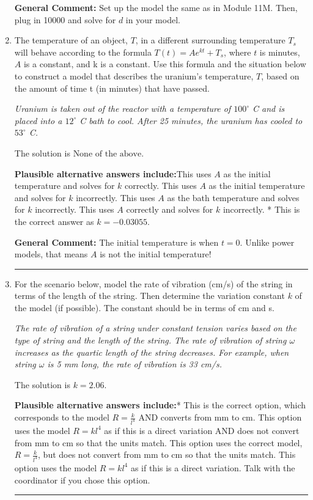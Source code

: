 \documentclass{extbook}[14pt]
\newcommand{\litem}[1]{\item #1

\rule{\textwidth}{0.4pt}}
\begin{document}
\begin{enumerate}
{\textbf{General Comment:} Set up the model the same as in Module 11M. Then, plug in 10000 and solve for $d$ in your model.
}
\litem{
The temperature of an object, $T$, in a different surrounding temperature $T_s$ will behave according to the formula $T(t) = Ae^{kt} + T_s$, where $t$ is minutes, $A$ is a constant, and k is a constant. Use this formula and the situation below to construct a model that describes the uranium's temperature, $T$, based on the amount of time t (in minutes) that have passed.

\begin{center}
    \textit{ Uranium is taken out of the reactor with a temperature of $100^{\circ}$ C and is placed into a $12^{\circ}$ C bath to cool. After 25 minutes, the uranium has cooled to $53^{\circ}$ C. }
\end{center}
The solution is \( \text{None of the above} \).\begin{enumerate}[label=\Alph*.]
\textbf{Plausible alternative answers include:}This uses $A$ as the initial temperature and solves for $k$ correctly.
This uses $A$ as the initial temperature and solves for $k$ incorrectly.
This uses $A$ as the bath temperature and solves for $k$ incorrectly.
This uses $A$ correctly and solves for $k$ incorrectly.
* This is the correct answer as $k = -0.03055$.
\end{enumerate}

\textbf{General Comment:} The initial temperature is when $t = 0$. Unlike power models, that means $A$ is not the initial temperature!
}
\litem{
For the scenario below, model the rate of vibration (cm/s) of the string in terms of the length of the string. Then determine the variation constant $k$ of the model (if possible). The constant should be in terms of cm and s.

\begin{center}
    \textit{ The rate of vibration of a string under constant tension varies based on the type of string and the length of the string. The rate of vibration of string $\omega$ increases as the quartic length of the string decreases. For example, when string $\omega$ is 5 mm long, the rate of vibration is 33 cm/s. }
\end{center}
The solution is \( k = 2.06 \).\begin{enumerate}[label=\Alph*.]
\textbf{Plausible alternative answers include:}* This is the correct option, which corresponds to the model $R = \frac{k}{l^{4}}$ AND converts from mm to cm.
This option uses the model $R = kl^{4}$ as if this is a direct variation AND does not convert from mm to cm so that the units match.
This option uses the correct model, $R = \frac{k}{l^{4}}$, but does not convert from mm to cm so that the units match.
This option uses the model $R = kl^{4}$ as if this is a direct variation.
Talk with the coordinator if you chose this option.
\end{enumerate}

}
\end{enumerate}
\end{document}
